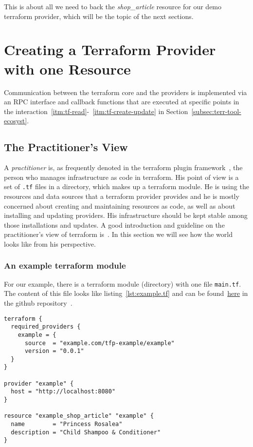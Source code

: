 \documentclass[paper=a4,11pt,numbers=noenddot]{article}
\begin{document}
This is about all we need to back the \emph{shop\_article} resource for our demo terraform provider, which will be the topic of the next sections.

\section{Creating a Terraform Provider with one Resource}
\label{sec:creat-terr-prov}

Communication between the terraform core and the providers is implemented via an RPC interface and callback functions that are executed at specific points in the interaction~\ref{itm:tf-read}-~\ref{itm:tf-create-update} in Section~\ref{subsec:terr-tool-ecosyst}.

\subsection{The Practitioner's View}
\label{subsec:practitioners-view}

A \emph{practitioner} is, as frequently denoted in the terraform plugin framework~\cite{noauthor_terraform_framework_nodate}, the person who manages infrastructure as code in terraform. His point of view is a set of \verb'.tf' files in a directory, which makes up a terraform module. He is using the resources and data sources that a terraform provider provides and he is mostly concerned about creating and maintaining resources as code, as well as about installing and updating providers. His infrastructure should be kept stable among those installations and updates. A good introduction and guideline on the practitioner's view of terraform is~\cite{brikman_terraform_2022}. In this section we will see how the world looks like from his perspective.

\subsubsection{An example terraform module}
\label{subsubsec:an-example-terraform}

For our example, there is a terraform module (directory) with one file \verb'main.tf'. The content of this file looks like listing~\ref{lst:example.tf} and can be found~\href{https://github.com/ecky-l/terraform-provider-example/blob/main/src/exampletf}{here} in the github repository~\cite{ecky-l_terraform-provider-example_nodate}.

\begin{lstlisting}[label=lst:example.tf]
terraform {
  required_providers {
    example = {
      source  = "example.com/tfp-example/example"
      version = "0.0.1"
  }
}

provider "example" {
  host = "http://localhost:8080"
}

resource "example_shop_article" "example" {
  name        = "Princess Rosalea"
  description = "Child Shampoo & Conditioner"
}
\end{lstlisting}
\end{document}
